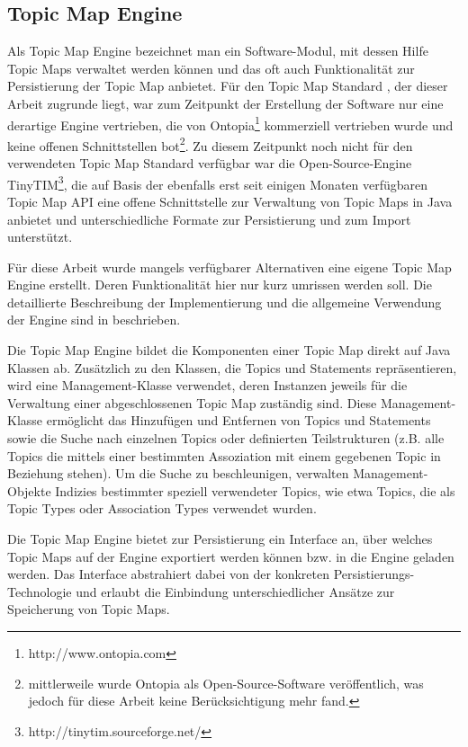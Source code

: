 \subsection{Topic Map Engine}

Als Topic Map Engine bezeichnet man ein Software-Modul, mit dessen Hilfe Topic Maps verwaltet werden können und das oft auch Funktionalität zur Persistierung der Topic Map anbietet. Für den Topic Map Standard \citep{TMDM08}, der dieser Arbeit zugrunde liegt, war zum Zeitpunkt der Erstellung der Software nur eine derartige Engine vertrieben, die von Ontopia\footnote{http://www.ontopia.com} kommerziell vertrieben wurde und keine offenen Schnittstellen bot\footnote{mittlerweile wurde Ontopia als Open-Source-Software veröffentlich, was jedoch für diese Arbeit keine Berücksichtigung mehr fand.}. Zu diesem Zeitpunkt noch nicht für den verwendeten Topic Map Standard verfügbar war die Open-Source-Engine TinyTIM\footnote{http://tinytim.sourceforge.net/}, die auf Basis der ebenfalls erst seit einigen Monaten verfügbaren Topic Map \gls{API} eine offene Schnittstelle zur Verwaltung von Topic Maps in Java anbietet und unterschiedliche Formate zur Persistierung und zum Import unterstützt.

Für diese Arbeit wurde mangels verfügbarer Alternativen eine eigene Topic Map Engine erstellt. Deren Funktionalität hier nur kurz umrissen werden soll. Die detaillierte Beschreibung der Implementierung und die allgemeine Verwendung der Engine sind in \citep{Oppl07} beschrieben.

Die Topic Map Engine bildet die Komponenten einer Topic Map direkt auf Java Klassen ab. Zusätzlich zu den Klassen, die Topics und Statements repräsentieren, wird eine Management-Klasse verwendet, deren Instanzen jeweils für die Verwaltung einer abgeschlossenen Topic Map zuständig sind. Diese Management-Klasse ermöglicht das Hinzufügen und Entfernen von Topics und Statements sowie die Suche nach einzelnen Topics oder definierten Teilstrukturen (z.B. alle Topics die mittels einer bestimmten Assoziation mit einem gegebenen Topic in Beziehung stehen). Um die Suche zu beschleunigen, verwalten Management-Objekte Indizies bestimmter speziell verwendeter Topics, wie etwa Topics, die als Topic Types oder Association Types verwendet wurden.

Die Topic Map Engine bietet zur Persistierung ein Interface an, über welches Topic Maps auf der Engine exportiert werden können bzw. in die Engine geladen werden. Das Interface abstrahiert dabei von der konkreten Persistierungs-Technologie und erlaubt die Einbindung unterschiedlicher Ansätze zur Speicherung von Topic Maps.

